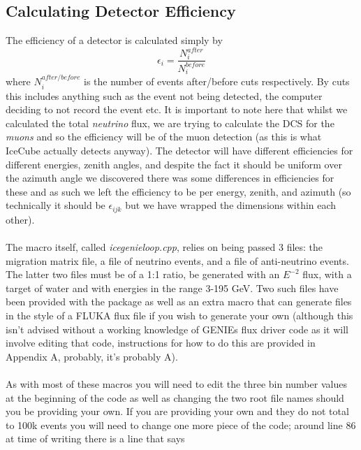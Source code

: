 \documentclass[12pt]{article}
\numberwithin{equation}{section}
\numberwithin{figure}{section}
\begin{document}
\subsection{Calculating Detector Efficiency} %
\label{sub:calculating_detector_efficiency}
The efficiency of a detector is calculated simply by
\begin{equation}
	\epsilon_i = \frac{N^{after}_i}{N^{before}_i}
	\label{eq:effic}
\end{equation}
where $N^{after/before}_i$ is the number of events after/before cuts respectively. By cuts this includes anything such as the event not being detected, the computer deciding to not record the event etc. It is important to note here that whilst we calculated the total \emph{neutrino} flux, we are trying to calculate the DCS for the \emph{muons} and so the efficiency will be of the muon detection (as this is what IceCube actually detects anyway). The detector will have different efficiencies for different energies, zenith angles, and despite the fact it should be uniform over the azimuth angle we discovered there was some differences in efficiencies for these and as such we left the efficiency to be per energy, zenith, and azimuth (so technically it should be $\epsilon_{ijk}$ but we have wrapped the dimensions within each other). \\
\\
The macro itself, called \emph{ice\textunderscore genie\textunderscore loop.cpp}, relies on being passed 3 files: the migration matrix file, a file of neutrino events, and a file of anti-neutrino events. The latter two files must be of a 1:1 ratio, be generated with an $E^{-2}$ flux, with a target of water and with energies in the range 3-195 GeV. Two such files have been provided with the package as well as an extra macro that can generate files in the style of a FLUKA flux file if you wish to generate your own (although this isn't advised without a working knowledge of GENIEs flux driver code as it will involve editing that code, instructions for how to do this are provided in Appendix A, probably, it's probably A). \\
\\
As with most of these macros you will need to edit the three bin number values at the beginning of the code as well as changing the two root file names should you be providing your own. If you are providing your own and they do not total to 100k events you will need to change one more piece of the code; around line 86 at time of writing there is a line that says \\
\end{document}
